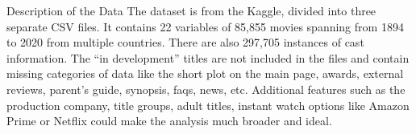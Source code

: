 \documentclass[
  ignorenonframetext,
]{beamer}
\newenvironment{Shaded}{\begin{snugshade}}{\end{snugshade}}
\newcommand{\AttributeTok}[1]{\textcolor[rgb]{0.77,0.63,0.00}{#1}}
\newcommand{\ConstantTok}[1]{\textcolor[rgb]{0.00,0.00,0.00}{#1}}
\newcommand{\FunctionTok}[1]{\textcolor[rgb]{0.00,0.00,0.00}{#1}}
\newcommand{\NormalTok}[1]{#1}
\newcommand{\OtherTok}[1]{\textcolor[rgb]{0.56,0.35,0.01}{#1}}
\newcommand{\SpecialCharTok}[1]{\textcolor[rgb]{0.00,0.00,0.00}{#1}}
\newcommand{\StringTok}[1]{\textcolor[rgb]{0.31,0.60,0.02}{#1}}
\begin{document}
\begin{frame}[fragile]{Description of the Data}
\protect\hypertarget{description-of-the-data}{}
The dataset is from the Kaggle, divided into three separate CSV files.
It contains 22 variables of 85,855 movies spanning from 1894 to 2020
from multiple countries. There are also 297,705 instances of cast
information. The ``in development'' titles are not included in the files
and contain missing categories of data like the short plot on the main
page, awards, external reviews, parent's guide, synopsis, faqs, news,
etc. Additional features such as the production company, title groups,
adult titles, instant watch options like Amazon Prime or Netflix could
make the analysis much broader and ideal.

\begin{Shaded}
\end{Shaded}
\end{frame}
\end{document}
